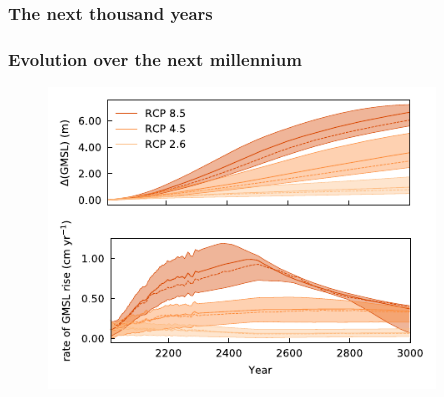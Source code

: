 \documentclass[hide notes,intlimits]{beamer}
\begin{document}
\begin{frame}
  \frametitle{The next thousand years}
  \begin{figure}
  \end{figure}
\end{frame}


\begin{frame}
  \frametitle{Evolution over the next millennium}
  \begin{figure}
    \includegraphics[height=8cm]{les-results}
  \end{figure}
\end{frame}
\end{document}
